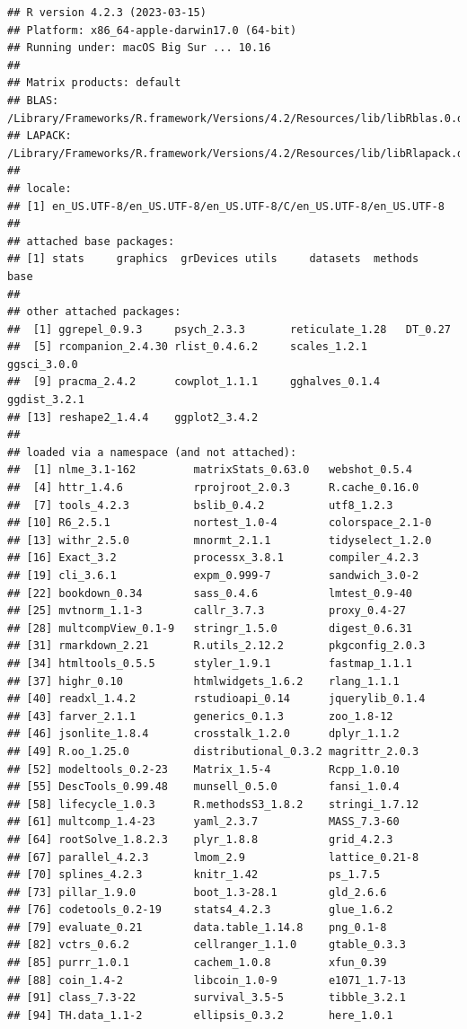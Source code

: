 \documentclass[
  11pt,
  oneside]{book}
\begin{document}
\begin{verbatim}
## R version 4.2.3 (2023-03-15)
## Platform: x86_64-apple-darwin17.0 (64-bit)
## Running under: macOS Big Sur ... 10.16
## 
## Matrix products: default
## BLAS:   /Library/Frameworks/R.framework/Versions/4.2/Resources/lib/libRblas.0.dylib
## LAPACK: /Library/Frameworks/R.framework/Versions/4.2/Resources/lib/libRlapack.dylib
## 
## locale:
## [1] en_US.UTF-8/en_US.UTF-8/en_US.UTF-8/C/en_US.UTF-8/en_US.UTF-8
## 
## attached base packages:
## [1] stats     graphics  grDevices utils     datasets  methods   base     
## 
## other attached packages:
##  [1] ggrepel_0.9.3     psych_2.3.3       reticulate_1.28   DT_0.27          
##  [5] rcompanion_2.4.30 rlist_0.4.6.2     scales_1.2.1      ggsci_3.0.0      
##  [9] pracma_2.4.2      cowplot_1.1.1     gghalves_0.1.4    ggdist_3.2.1     
## [13] reshape2_1.4.4    ggplot2_3.4.2    
## 
## loaded via a namespace (and not attached):
##  [1] nlme_3.1-162         matrixStats_0.63.0   webshot_0.5.4       
##  [4] httr_1.4.6           rprojroot_2.0.3      R.cache_0.16.0      
##  [7] tools_4.2.3          bslib_0.4.2          utf8_1.2.3          
## [10] R6_2.5.1             nortest_1.0-4        colorspace_2.1-0    
## [13] withr_2.5.0          mnormt_2.1.1         tidyselect_1.2.0    
## [16] Exact_3.2            processx_3.8.1       compiler_4.2.3      
## [19] cli_3.6.1            expm_0.999-7         sandwich_3.0-2      
## [22] bookdown_0.34        sass_0.4.6           lmtest_0.9-40       
## [25] mvtnorm_1.1-3        callr_3.7.3          proxy_0.4-27        
## [28] multcompView_0.1-9   stringr_1.5.0        digest_0.6.31       
## [31] rmarkdown_2.21       R.utils_2.12.2       pkgconfig_2.0.3     
## [34] htmltools_0.5.5      styler_1.9.1         fastmap_1.1.1       
## [37] highr_0.10           htmlwidgets_1.6.2    rlang_1.1.1         
## [40] readxl_1.4.2         rstudioapi_0.14      jquerylib_0.1.4     
## [43] farver_2.1.1         generics_0.1.3       zoo_1.8-12          
## [46] jsonlite_1.8.4       crosstalk_1.2.0      dplyr_1.1.2         
## [49] R.oo_1.25.0          distributional_0.3.2 magrittr_2.0.3      
## [52] modeltools_0.2-23    Matrix_1.5-4         Rcpp_1.0.10         
## [55] DescTools_0.99.48    munsell_0.5.0        fansi_1.0.4         
## [58] lifecycle_1.0.3      R.methodsS3_1.8.2    stringi_1.7.12      
## [61] multcomp_1.4-23      yaml_2.3.7           MASS_7.3-60         
## [64] rootSolve_1.8.2.3    plyr_1.8.8           grid_4.2.3          
## [67] parallel_4.2.3       lmom_2.9             lattice_0.21-8      
## [70] splines_4.2.3        knitr_1.42           ps_1.7.5            
## [73] pillar_1.9.0         boot_1.3-28.1        gld_2.6.6           
## [76] codetools_0.2-19     stats4_4.2.3         glue_1.6.2          
## [79] evaluate_0.21        data.table_1.14.8    png_0.1-8           
## [82] vctrs_0.6.2          cellranger_1.1.0     gtable_0.3.3        
## [85] purrr_1.0.1          cachem_1.0.8         xfun_0.39           
## [88] coin_1.4-2           libcoin_1.0-9        e1071_1.7-13        
## [91] class_7.3-22         survival_3.5-5       tibble_3.2.1        
## [94] TH.data_1.1-2        ellipsis_0.3.2       here_1.0.1
\end{verbatim}
\end{document}
